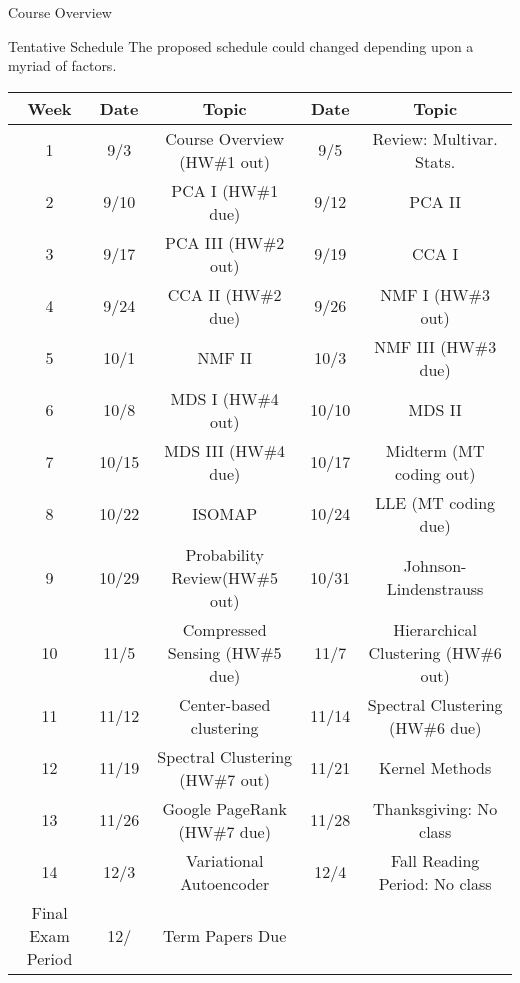 \documentclass{beamer}
\begin{document}
\begin{frame}{Course Overview}
\begin{block}{Tentative Schedule}
{\small The proposed schedule could changed depending upon a myriad of factors. }
{\tiny 
\begin{center}
\renewcommand{\arraystretch}{1.25}
\begin{table}[h!]
\begin{tabular}{|c|c|c|c|c|}
\hline
Week & Date & Topic & Date & Topic \\
\hline
1 & 9/3&   Course Overview (HW\#1 out)  & 9/5 & Review: Multivar. Stats. \\
\hline
2 & 9/10 & 	 PCA	I (HW\#1 due) & 9/12& PCA II \\
\hline
3 & 9/17 & PCA III  (HW\#2 out)& 9/19 & CCA I    \\
 \hline 
 4 & 9/24 & CCA II  (HW\#2 due)& 9/26 & NMF I (HW\#3 out)   \\
 \hline
 5 & 10/1 &  NMF II   & 10/3 & NMF III (HW\#3 due)   \\
 \hline 
 6 & 10/8 & MDS I (HW\#4 out)  & 10/10 & MDS II \\
 \hline 
 7 & 10/15 & MDS III (HW\#4 due)   & 10/17 & Midterm (MT coding out)  \\ 
 \hline
 8 & 10/22 & ISOMAP  & 10/24 & LLE  (MT coding due)   \\ 
 \hline
 9 & 10/29 &  Probability Review(HW\#5 out) &10/31 &  Johnson-Lindenstrauss  \\
 \hline
 10 & 11/5 & Compressed Sensing (HW\#5 due)   & 11/7  &  Hierarchical Clustering (HW\#6 out)  \\
 \hline
 11 & 11/12 &  Center-based clustering  & 11/14 &  Spectral Clustering (HW\#6 due)    \\
 \hline
 12 & 11/19 &  Spectral Clustering (HW\#7 out) & 11/21 & Kernel Methods \\
 \hline
 13 & 11/26 &  Google PageRank (HW\#7 due)  & 11/28 & Thanksgiving: No class \\ 
 \hline
 14 & 12/3 &  Variational Autoencoder & 12/4 & Fall Reading Period: No class \\
 \hline
 Final Exam Period & 12/ & Term Papers Due &  & \\
\hline
\end{tabular}
\end{table}
\end{center}

}
\end{block}
\end{frame}
\end{document}
